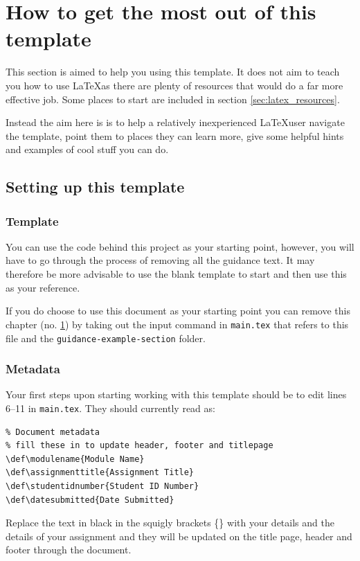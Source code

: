 \section{How to get the most out of this template} \label{cha:how-to-template}
This section is aimed to help you using this template. It does not aim to teach you how to use \LaTeX as there are plenty of resources that would do a far more effective job. Some places to start are included in section \ref{sec:latex_resources}.

Instead the aim here is is to help a relatively inexperienced \LaTeX user navigate the template, point them to places they can learn more, give some helpful hints and examples of cool stuff you can do.

\subsection{Setting up this template}

\subsubsection{Template}
You can use the code behind this project as your starting point, however, you will have to go through the process of removing all the guidance text. It may therefore be more advisable to use the blank template to start and then use this as your reference.

If you do choose to use this document as your starting point you can remove this chapter (no. \ref{cha:how-to-template}) by taking out the input command in \verb|main.tex| that refers to this file and the \verb|guidance-example-section| folder.

\subsubsection{Metadata}
Your first steps upon starting working with this template should be to edit lines \numrange{6}{11} in \verb|main.tex|. They should currently read as:

\begin{verbatim}
% Document metadata
% fill these in to update header, footer and titlepage
\def\modulename{Module Name}
\def\assignmenttitle{Assignment Title}
\def\studentidnumber{Student ID Number}
\def\datesubmitted{Date Submitted}
\end{verbatim}

Replace the text in black in the squigly brackets \{\} with your details and the details of your assignment and they will be updated on the title page, header and footer through the document.

